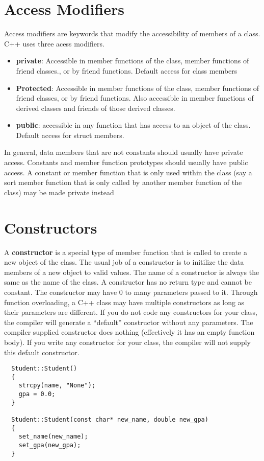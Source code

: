 \documentclass{report}
\begin{document}
  \section{Access Modifiers}
  Access modifiers are keywords that modify the accessibility of members of a class. C++ uses three acess modifiers.
  \begin{itemize}
    \item \textbf{private}: Accessible in member functions of the class, member functions of friend classes., or by friend functions. Default access for class members
    \item \textbf{Protected}: Accessible in member functions of the class, member functions of friend classes, or by friend functions. Also accessible in member functions of derived classes and friends of those derived classes.
    \item \textbf{public}: accessible in any function that has access to an object of the class. Default access for struct members.
  \end{itemize}
  \bigbreak \noindent
  In general, data members that are not constants should usually have private access. Constants and member function prototypes should usually have public access. A constant or member function that is only used within the class (say a sort member function that is only called by another member function of the class) may be made private instead
  \section{Constructors}
  A \textbf{constructor} is a special type of member function that is called to create a new object of the class. The usual job of a constructor is to initilize the data members of a new object to valid values.
  \bigbreak \noindent
  The name of a constructor is always the same as the name of the class. A constructor has no return type and cannot be constant. The constructor may have 0 to many parameters passed to it.
  \bigbreak \noindent
  Through function overloading, a C++ class may have multiple constructors as long as their parameters are different.
  \bigbreak \noindent
  If you do not code any constructors for your class, the compiler will generate a ``default'' constructor without any parameters. The compiler supplied constructor does nothing (effectively it has an empty function body). If you write any constructor for your class, the compiler will not supply this default constructor.
  \bigbreak \noindent
  \begin{verbatim}
  Student::Student()
  {
    strcpy(name, "None");
    gpa = 0.0;
  }

  Student::Student(const char* new_name, double new_gpa)
  {
    set_name(new_name);
    set_gpa(new_gpa);
  }
  \end{verbatim}
  \newpage
\end{document}
